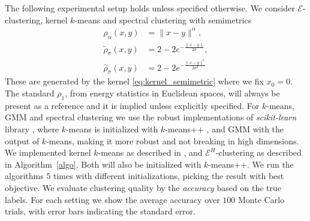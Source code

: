 \documentclass[twoside]{article}
\newcommand\kk{K}
\begin{document}
The following experimental setup holds unless specified
otherwise. 
We consider
$\mathcal{E}$-clustering, kernel $k$-means and spectral clustering
with semimetrics
\begin{equation}
\begin{split}
\rho_{\alpha}(x,y) &= \| x-y \|^{\alpha}, \\
%
\widetilde{\rho}_{\sigma}(x,y) &= 2 - 2 e^{-\tfrac{\|x-y\|}{2 \sigma}},  \\
%
\widehat{\rho}_{\sigma}(x,y) &= 2 - 2 e^{-\tfrac{\|x-y\|^2}{2 \sigma^2}}  
\end{split}
\end{equation}
These are generated by the kernel \eqref{eq:kernel_semimetric}
where we fix $x_0=0$.
The standard $\rho_1$, from energy statistics in Euclidean
spaces, will always be present as a reference and it
is implied unless explicitly specified.
For $k$-means, GMM and spectral clustering we use the robust 
implementations of \emph{scikit-learn} library \citep{scikit-learn}, where  
$k$-means is initialized with 
$k$-means++ \citep{Vassilvitskii}, 
and GMM with the output of $k$-means, making it more robust and not
breaking in high dimensions. 
We implemented kernel $k$-means
as described in \citep{Dhillon2,Dhillon}, and $\mathcal{E}^H$-clustering
as described in Algorithm~\ref{algo}. Both
will also be initialized with $k$-means++.
We run the algorithms $5$ times with different initializations, picking
the result with best objective. 
We evaluate clustering quality by
the \emph{accuracy} based on the true labels. For each setting we show 
the average accuracy over $100$ Monte
Carlo trials, with error bars indicating the standard error.
\end{document}
